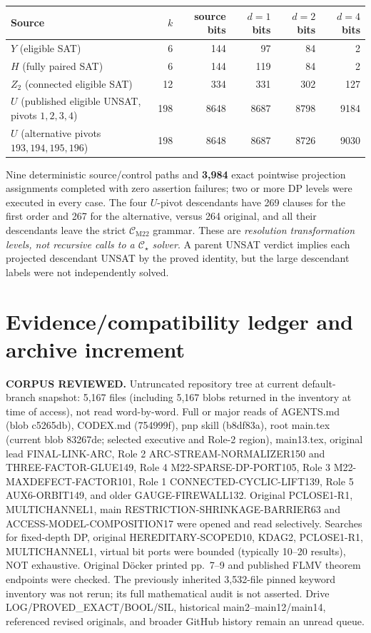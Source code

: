 \documentclass[11pt]{article}
\newcommand{\CM}{\mathcal C_{\mathrm{M22}}}
\newcommand{\CS}{\mathcal C_\star}
\begin{document}
\begin{center}\small
\begin{tabular}{lrrrrr}
\toprule
Source & $k$ & source bits & $d=1$ bits & $d=2$ bits & $d=4$ bits\\\midrule
$Y$ (eligible SAT) &6&144&97&84&2\\
$H$ (fully paired SAT) &6&144&119&84&2\\
$Z_2$ (connected eligible SAT)&12&334&331&302&127\\
$U$ (published eligible UNSAT, pivots $1,2,3,4$)&198&8648&8687&8798&9184\\
$U$ (alternative pivots $193,194,195,196$)&198&8648&8687&8726&9030\\
\bottomrule
\end{tabular}
\end{center}
Nine deterministic source/control paths and \textbf{3,984} exact pointwise projection assignments completed with zero assertion failures; two or more DP levels were executed in every case. The four $U$-pivot descendants have 269 clauses for the first order and 267 for the alternative, versus 264 original, and all their descendants leave the strict $\CM$ grammar. These are \emph{resolution transformation levels, not recursive calls to a $\CS$ solver}. A parent UNSAT verdict implies each projected descendant UNSAT by the proved identity, but the large descendant labels were not independently solved.

\section{Evidence/compatibility ledger and archive increment}
\noindent\textbf{CORPUS REVIEWED.} Untruncated repository tree at current default-branch snapshot: 5,167 files (including 5,167 blobs returned in the inventory at time of access), not read word-by-word. Full or major reads of AGENTS.md (blob c5265db), CODEX.md (754999f), pnp skill (b8df83a), root main.tex (current blob 83267de; selected executive and Role-2 region), main13.tex, original lead FINAL-LINK-ARC, Role 2 ARC-STREAM-NORMALIZER150 and THREE-FACTOR-GLUE149, Role 4 M22-SPARSE-DP-PORT105, Role 3 M22-MAXDEFECT-FACTOR101, Role 1 CONNECTED-CYCLIC-LIFT139, Role 5 AUX6-ORBIT149, and older GAUGE-FIREWALL132. Original PCLOSE1-R1, MULTICHANNEL1, main RESTRICTION-SHRINKAGE-BARRIER63 and ACCESS-MODEL-COMPOSITION17 were opened and read selectively. Searches for fixed-depth DP, original HEREDITARY-SCOPED10, KDAG2, PCLOSE1-R1, MULTICHANNEL1, virtual bit ports were bounded (typically 10--20 results), NOT exhaustive. Original D\"ocker printed pp.~7--9 and published FLMV theorem endpoints were checked. The previously inherited 3,532-file pinned keyword inventory was not rerun; its full mathematical audit is not asserted. Drive LOG/PROVED\_EXACT/BOOL/SIL, historical main2--main12/main14, referenced revised originals, and broader GitHub history remain an unread queue.
\end{document}

